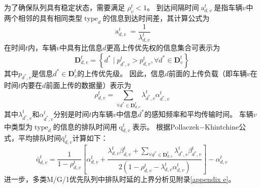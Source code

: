 为了确保队列具有稳定状态，需要满足 $\rho_{v}^{t} < 1$。
到达间隔时间$\operatorname{a}_{d, v}^t$是指车辆$v$中两个相邻的具有相同类型$\operatorname{type}_d$的信息到达时间差，其计算公式为  
\begin{equation}
    \operatorname{a}_{d, v}^t=\frac{1}{\lambda_{d, v}^{t}}
\end{equation}
在时间$t$内，车辆$v$中具有比信息$d$更高上传优先权的信息集合可表示为
\begin{equation}
\mathbf{D}_{d, v}^t=\left\{d^* \mid p_{d^*, v}^t>p_{d, v}^t, \forall d^* \in \mathbf{D}_v^t\right\} 
\end{equation}
其中$p_{d^*, v}$是信息$d^* \in \mathbf{D}_v^t$的上传优先级。
  因此，信息$d$前面的上传负载（即车辆$v$在时间$t$内要在$d$前面上传的数据量）表示为
\begin{equation}
\rho_{d, v}^t=\sum_{\forall d^* \in \mathbf{D}_{d, v}^t} \lambda_{d^*, v}^t \alpha_{d^*, v}^t
\end{equation}
其中$\lambda_{d^*, v}^t$和$\alpha_{d^*, v}^t$分别是时间$t$内车辆$v$中信息$d^*$的感知频率和平均传输时间。
车辆$v$中类型为$\operatorname{type}_d$的信息的排队时间用$\operatorname{q}_{d, v}^t$表示。
根据Pollaczek$-$Khintchine公式\cite{takine2001queue}，平均排队时间$\operatorname{\bar{q}}_{d, v}^t$计算如下：
\begin{equation}
    \operatorname{\bar{q}}_{d, v}^t= \frac{1} {1 - \rho_{d, v}^{t}} 
        \left[ \alpha_{d, v}^t + \frac{ \lambda_{d, v}^{t} \beta_{d, v}^t + \sum\limits_{\forall d^* \in \mathbf{D}_{d, v}^t} \lambda_{d^*,s}^t \beta_{d^*, v}^t }{2\left(1-\rho_{d, v}^{t} - \lambda_{d, v}^{t}  \alpha_{d, v}^t\right)}\right] 
        - \alpha_{d, v}^t
\label{equ 2-6}
\end{equation}
进一步，多类M/G/1优先队列中排队时延的上界分析见附录\ref{appendix e}。

